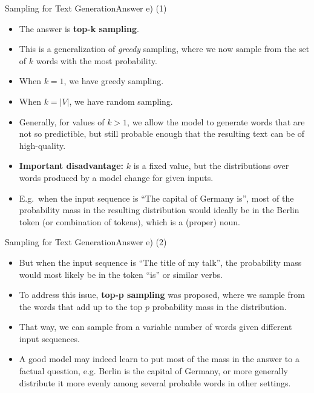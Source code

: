 \documentclass[t]{beamer}
\begin{document}
\begin{frame}{Sampling for Text Generation}{Answer e) (1)}
    \begin{itemize}
        \item The answer is \textbf{top-k sampling}. \
        \item This is a generalization of \emph{greedy} sampling, where we now
              sample from the set of $k$ words with the most probability.
        \item When $k=1$, we have greedy sampling.
        \item When $k=|V|$, we have random sampling.
        \item Generally, for values of $k > 1$, we allow the model to generate
              words that are not so predictible, but still probable enough that
              the resulting text can be of high-quality.
        \item \textbf{Important disadvantage:} $k$ is a fixed value, but the
              distributions over words produced by a model change for given
              inputs.
        \item E.g.\ when the input sequence is ``The capital of Germany is'',
              most of the probability mass in the resulting distribution would
              ideally be in the Berlin token (or combination of tokens),
              which is a (proper) noun.
    \end{itemize}
\end{frame}

\begin{frame}{Sampling for Text Generation}{Answer e) (2)}
    \begin{itemize}
        \item But when the input sequence is ``The title of my talk'', the
              probability mass would most likely be in the token ``is'' or
              similar verbs.
        \item To address this issue, \textbf{top-p sampling} was proposed, where
              we sample from the words that add up to the top $p$ probability
              mass in the distribution.
        \item That way, we can sample from a variable number of words given
              different input sequences.
        \item A good model may indeed learn to put most of the mass in the
              answer to a factual question, e.g. Berlin is the capital of
              Germany, or more generally distribute it more evenly among several
              probable words in other settings.
    \end{itemize}
\end{frame}
\end{document}
